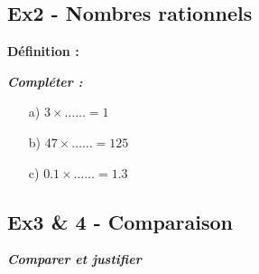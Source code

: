 \documentclass[11pt]{article}
\begin{document}
\subsection*{Ex2 - Nombres rationnels}

\textbf{Définition :} \dotfill

\textit{\textbf{Compléter :}}

\begin{multicols}{3}

  \begin{enumerate}
  \item[a)] $ 3 \times \ldots \ldots = 1$
  \item[b)] $ 47 \times \ldots \ldots = 125$
  \item[c)] $ 0.1 \times \ldots \ldots = 1.3$
  \end{enumerate}

\end{multicols}

\subsection*{Ex3 \& 4 - Comparaison}

\textit{\textbf{Comparer et justifier}}
\end{document}
